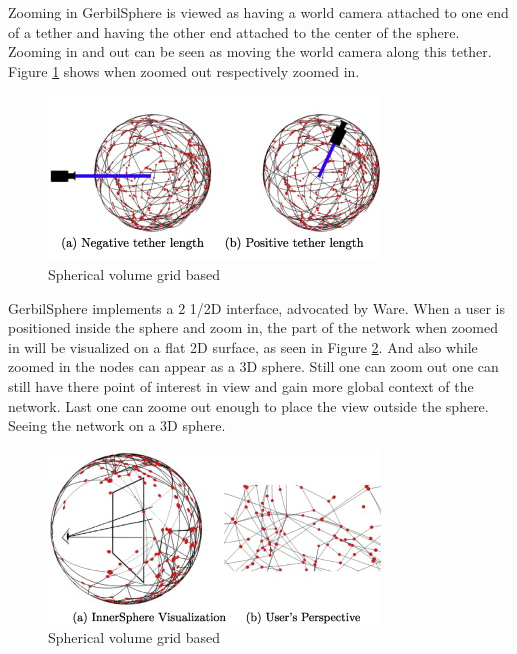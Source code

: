 \documentclass[a4paper,11pt]{kth-mag}
\begin{document}
Zooming in GerbilSphere is viewed as having a world camera attached to one end of a tether and having the other end attached to the center of the sphere. Zooming in and out can be seen as moving the world camera along this 
tether. Figure \ref{fig:gerbil_zoom} shows when zoomed out respectively zoomed in.
\begin{figure}[!htbp]
	\centering
	\includegraphics{GerbilZoomTether}
	\caption{Spherical volume grid based}
	\label{fig:gerbil_zoom}
\end{figure}

GerbilSphere implements a 2 1/2D interface, advocated by Ware\cite{Ware}. When a user is positioned inside the sphere and zoom in, the part of the network when zoomed in will be visualized on a flat 2D surface, as seen in Figure
\ref{fig:gerbil_POV}. And also while zoomed in the nodes can appear as a 3D sphere. Still one can zoom out one can still have there point of interest in view and gain more global context of the network. Last one can zoome
 out enough to place the view outside the sphere. Seeing the network on a 3D sphere.
 \begin{figure}[!htbp]
	\centering
	\includegraphics{GerbilPointOfView}
	\caption{Spherical volume grid based}
	\label{fig:gerbil_POV}
\end{figure}
\\
\end{document}
